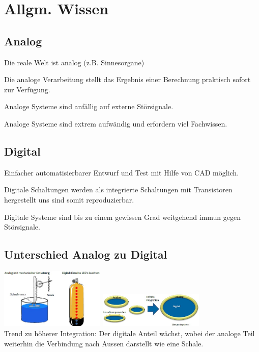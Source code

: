 \section{Allgm. Wissen}
\subsection{Analog}
	\begin{compactitem}
		\item Die reale Welt ist analog (z.B. Sinnesorgane)
		\item Die analoge Verarbeitung stellt das Ergebnis einer Berechnung praktisch sofort zur Verfügung.
		\item Analoge Systeme sind anfällig auf externe Störsignale.
		\item Analoge Systeme sind extrem aufwändig und erfordern viel Fachwissen.	
	\end{compactitem}
	
\subsection{Digital}
	\begin{compactitem}
		\item Einfacher automatisierbarer Entwurf und Test mit Hilfe von CAD möglich.
		\item Digitale Schaltungen werden als integrierte Schaltungen mit Transistoren hergestellt uns sind somit reproduzierbar.
		\item Digitale Systeme sind bis zu einem gewissen Grad weitgehend immun gegen Störsignale.
	\end{compactitem}
	
\subsection{Unterschied Analog zu Digital}
\begin{multicols}{3}
	\includegraphics[width=5cm]{pics/unterschied_analog_digital.jpg}
		\columnbreak
	\includegraphics[width=5cm]{pics/analog_digital_integration.jpg}
		\columnbreak
		\\
	Trend zu höherer Integration: Der digitale Anteil wächst, wobei der analoge Teil weiterhin die Verbindung nach Aussen darstellt \lbrack wie eine Schale\rbrack.
\end{multicols}


